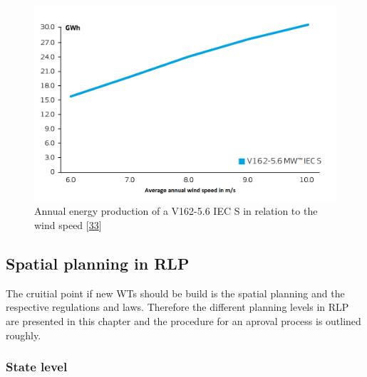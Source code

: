 \documentclass[a4paper,11pt]{article}
\begin{document}
\begin{figure}[H]

{\centering \includegraphics[width=0.8\linewidth]{figures/V162} 

}

\caption{Annual energy production of a V162-5.6 IEC S in relation to the wind speed {[}\protect\hyperlink{ref-VestasWindSystemsAS.2019}{33}{]}}\label{fig:v162}
\end{figure}
\hypertarget{spatial-planning-in-rlp}{%
\subsection{Spatial planning in RLP}\label{spatial-planning-in-rlp}}

The cruitial point if new WTs should be build is the spatial planning and the respective regulations and laws. Therefore the different planning levels in RLP are presented in this chapter and the procedure for an aproval process is outlined roughly.

\hypertarget{state-level}{%
\subsubsection{State level}\label{state-level}}
\end{document}
